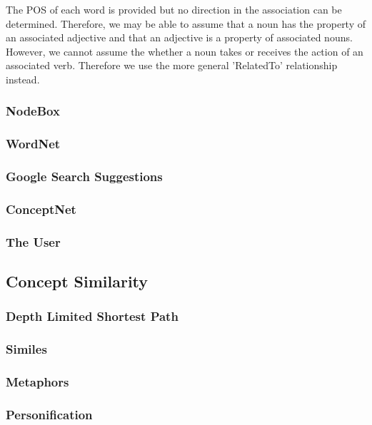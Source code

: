 The POS of each word is provided but no direction in the association can be determined. Therefore, we may be able to assume that a noun has the property of an associated adjective and that an adjective is a property of associated nouns. However, we cannot assume the whether a noun takes or receives the action of an associated verb. Therefore we use the more general 'RelatedTo' relationship instead.

\subsubsection{NodeBox}
\subsubsection{WordNet}
\subsubsection{Google Search Suggestions}
\subsubsection{ConceptNet}
\subsubsection{The User}


\subsection{Concept Similarity}
\subsubsection{Depth Limited Shortest Path}
\subsubsection{Similes}
\subsubsection{Metaphors}
\subsubsection{Personification}



